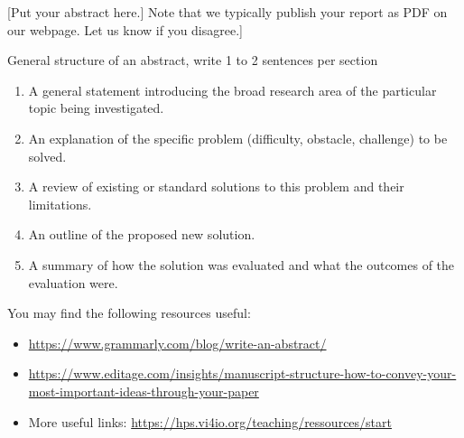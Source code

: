 [Put your abstract here.]
Note that we typically publish your report as PDF on our webpage. Let us know if you disagree.]

\medskip

General structure of an abstract, write 1 to 2 sentences per section
\begin{enumerate}
\item  A general statement introducing the broad research area of the particular topic being investigated.
\item  An explanation of the specific problem (difficulty, obstacle, challenge) to be solved.
\item  A review of existing or standard solutions to this problem and their limitations.
\item  An outline of the proposed new solution.
\item  A summary of how the solution was evaluated and what the outcomes of the evaluation were.
\end{enumerate}

You may find the following resources useful:
\begin{itemize}
    \item \url{https://www.grammarly.com/blog/write-an-abstract/}
    \item \url{https://www.editage.com/insights/manuscript-structure-how-to-convey-your-most-important-ideas-through-your-paper}
    \item More useful links: \url{https://hps.vi4io.org/teaching/ressources/start}
\end{itemize}

